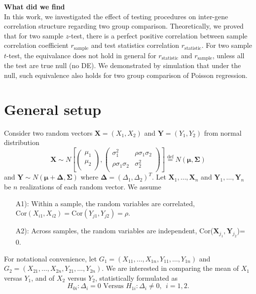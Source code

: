 \documentclass[11pt, a4paper]{article}
\begin{document}
\textbf{What did we find}\\
In this work, we investigated the effect of testing procedures on inter-gene correlation structure regarding two group comparison. Theoretically, we proved that for two sample $z$-test, there is a perfect positive correlation between sample correlation coefficient $r_{\text{sample}}$ and test statistics correlation $r_{\text{statistic}}$. For two sample $t$-test, the equivalance does not hold in general for $r_{\text{statistic}}$ and $r_{\text{sample}}$, unless all the test are true null (no DE).  We demonstrated by simulation that under the null, such equivalence also holds for two group comparison of Poisson regression. 







\section{General setup}
Consider two random vectors $\bm X = (X_1, X_2)$ and $\bm Y =  (Y_1, Y_2)$ from normal distribution
	\[ \bm X 
	\sim N\left[
	\left(\begin{array}{c}
	\mu_1\\
	\mu_2\\
	\end{array} \right), 
	\left(
	\begin{array}{cc}
	\sigma_1^2 &\rho \sigma_1\sigma_2 \\
	\rho \sigma_1 \sigma_2 & 	\sigma_2^2 \\
	\end{array}
	\right)
	\right]  \stackrel{\text{def}}{=} N(\bm \mu, \bm \Sigma)
	\] 
	 and $\bm Y \sim N(\bm \mu + \bm \Delta, \bm \Sigma)$ where $\bm \Delta = (\Delta_1, \Delta_2)^T$. Let $\bm X_1, \ldots, \bm X_n$ and $\bm Y_1, \ldots, \bm Y_n$ be $n$ realizations of each random vector. We assume
\begin{enumerate}
	\item[A1):] Within a sample, the random variables are correlated, $\text{Cor}(X_{i1}, X_{i2}) = \text{Cor}(Y_{j1}, Y_{j2}) = \rho$. 
	\item[A2):] Across samples, the random variables are independent, Cor($\bm X_{j_1}, \bm Y_{j_2}$)= 0. 
\end{enumerate} 

For notational convenience, let $G_1 = (X_{11}, \ldots, X_{1n}, Y_{11}, \ldots, Y_{1n})$ and $G_2 =  (X_{21}, \ldots, X_{2n}, Y_{21}, \ldots, Y_{2n})$. We are interested in comparing the mean of $X_1$ versas $Y_1$, and of $X_2$ versus $Y_2$, statistically formulated as \begin{equation}\label{hypotheses}
	H_{0i}:  \Delta_i = 0 \text{     Versus   }  H_{1i}: \Delta_i\neq 0 ,  ~~ i = 1, 2.
\end{equation}
\end{document}
